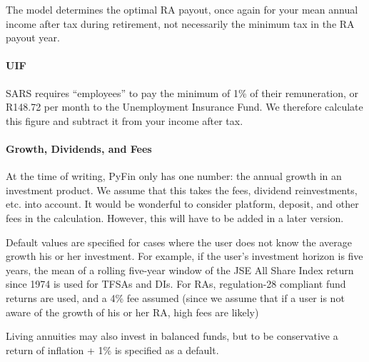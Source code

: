 \documentclass[a4paper, justified]{tufte-handout}
\begin{document}
The model determines the optimal RA payout, once again for your mean annual income after tax during retirement, not necessarily the minimum tax in the RA payout year.

\paragraph{UIF}
SARS requires ``employees'' to pay the minimum of 1\% of their remuneration, or R148.72 per month to the Unemployment Insurance Fund. We therefore calculate this figure and subtract it from your income after tax.

\paragraph{Growth, Dividends, and Fees}
At the time of writing, PyFin only has one number: the annual growth in an investment product. We assume that this takes the fees, dividend reinvestments, etc. into account. It would be wonderful to consider platform, deposit, and other fees in the calculation. However, this will have to be added in a later version. 

Default values are specified for cases where the user does not know the average growth his or her investment. For example, if the user's investment horizon is five years, the mean of a rolling five-year window of the JSE All Share Index return since 1974 is used for TFSAs and DIs. For RAs, regulation-28 compliant fund returns are used, and a 4\% fee assumed (since we assume that if a user is not aware of the growth of his or her RA, high fees are likely)

Living annuities may also invest in balanced funds, but to be conservative a return of inflation + 1\% is specified as a default.
\end{document}
